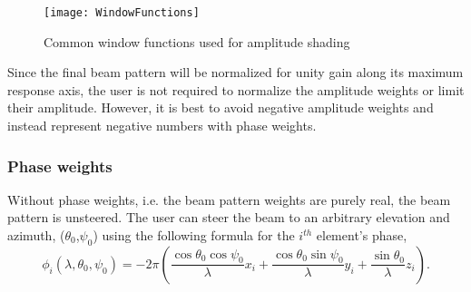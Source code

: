 \begin{figure}[!ht]
\begin{center}
\texttt{[image: WindowFunctions]}
\caption{\label{fig:WindowFunctions}Common window functions used for amplitude shading}
\end{center}
\end{figure}

Since the final beam pattern will be normalized for unity gain along its maximum response axis, the user is not required to normalize the amplitude weights or limit their amplitude. However, it is best to avoid negative amplitude weights and instead represent negative numbers with phase weights.

\subsubsection{Phase weights}

Without phase weights, i.e. the beam pattern weights are purely real, the beam pattern is unsteered. The user can steer the beam to an arbitrary elevation and azimuth, ($\theta_0$,$\psi_0$) using the following formula for the $i^{th}$ element's phase,
\begin{equation}
\phi_i(\lambda,\theta_0,\psi_0) = -2\pi\left(\frac{\cos\theta_0\cos\psi_0}{\lambda}x_i + \frac{\cos\theta_0\sin\psi_0}{\lambda}y_i + \frac{\sin\theta_0}{\lambda}z_i \right).
\end{equation}
